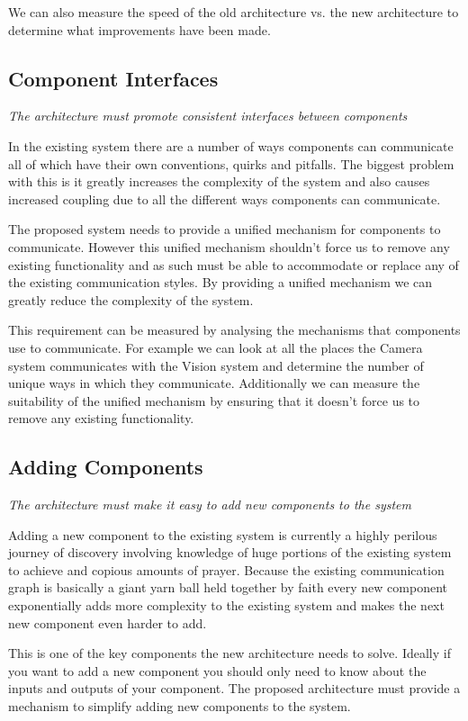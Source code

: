 \documentclass[english,12pt]{scrartcl}
\newcommand{\requirement}[1]{\textit{#1}}
\begin{document}
			We can also measure the speed of the old architecture vs. the new architecture to
			determine what improvements have been made.

		\subsection{Component Interfaces}
			\requirement{The architecture must promote consistent interfaces between components}

			In the existing system there are a number of ways components can communicate all of
			which have their own conventions, quirks and pitfalls. The biggest problem with this is
			it greatly increases the complexity of the system and also causes increased coupling due
			to all the different ways components can communicate.

			The proposed system needs to provide a unified mechanism for components to communicate.
			However this unified mechanism shouldn't force us to remove any existing functionality
			and as such must be able to accommodate or replace any of the existing communication
			styles. By providing a unified mechanism we can greatly reduce the complexity of the
			system.

			This requirement can be measured by analysing the mechanisms that components use to
			communicate. For example we can look at all the places the Camera system communicates
			with the Vision system and determine the number of unique ways in which they
			communicate. Additionally we can measure the suitability of the unified mechanism by
			ensuring that it doesn't force us to remove any existing functionality.

		\subsection{Adding Components}
			\requirement{The architecture must make it easy to add new components to the system}

			Adding a new component to the existing system is currently a highly perilous journey of
			discovery involving knowledge of huge portions of the existing system to achieve and
			copious amounts of prayer. Because the existing communication graph is basically a giant
			yarn ball held together by faith every new component exponentially adds more complexity
			to the existing system and makes the next new component even harder to add.

			This is one of the key components the new architecture needs to solve. Ideally if you
			want to add a new component you should only need to know about the inputs and outputs of
			your component. The proposed architecture must provide a mechanism to simplify adding
			new components to the system.
\end{document}
